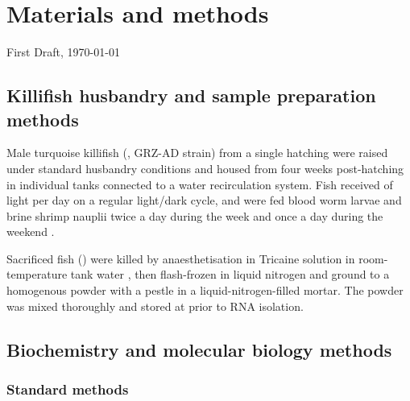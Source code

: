 
\chapter{Materials and methods}  
\onehalfspacing

\ifdefineChapter
	{\LARGE First Draft, \today}
\fi

\pagebreak


\section{Killifish husbandry and sample preparation methods}
\label{sec:methods_husbandry}

Male turquoise killifish (\nfu, GRZ-AD strain) from a single hatching were raised under standard husbandry conditions \parencite{dodzian2018husbandry} and housed from four weeks post-hatching in individual  tanks connected to a water recirculation system. Fish received  of light per day on a regular light/dark cycle, and were fed blood
worm larvae and brine shrimp nauplii twice a day during the week and once a day during the weekend \parencite{dodzian2018husbandry,smith2017microbiota}.

Sacrificed fish () were killed by anaesthetisation in  Tricaine solution in room-temperature tank water \parencite{carter2011tricaine}, then flash-frozen in liquid nitrogen and ground to a homogenous powder with a pestle in a liquid-nitrogen-filled mortar. The powder was mixed thoroughly and stored at  prior to RNA isolation.


\section{Biochemistry and molecular biology methods}

\subsection{Standard methods}

